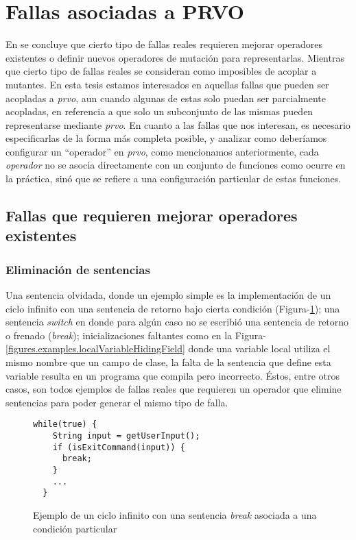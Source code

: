 \section{Fallas asociadas a PRVO}
\label{sec:prvo.prvoTargetedFaults}

En \cite{bibliography.mutation.evaluation.valid-substitute} se concluye que cierto tipo de fallas reales requieren mejorar operadores existentes o definir nuevos operadores de mutaci\'on para representarlas. Mientras que cierto tipo de fallas reales se consideran como imposibles de acoplar a mutantes. En esta tesis estamos interesados en aquellas fallas que pueden ser acopladas a \emph{prvo}, aun cuando algunas de estas solo puedan ser parcialmente acopladas, en referencia a que solo un subconjunto de las mismas pueden representarse mediante \emph{prvo}. En cuanto a las fallas que nos interesan, es necesario especificarlas de la forma m\'as completa posible, y analizar como deber\'iamos configurar un ``operador'' en \emph{prvo}, como mencionamos anteriormente, cada \emph{operador} no se asocia directamente con un conjunto de funciones como ocurre en la pr\'actica, sin\'o que se refiere a una configuraci\'on particular de estas funciones.

\subsection{Fallas que requieren mejorar operadores existentes}

\subsubsection{Eliminaci\'on de sentencias}

Una sentencia olvidada, donde un ejemplo simple es la implementaci\'on de un ciclo infinito con una sentencia de retorno bajo cierta condici\'on (Figura-\ref{figures.examples.infCicle}); una sentencia \emph{switch} en donde para alg\'un caso no se escribi\'o una sentencia de retorno o frenado (\emph{break}); inicializaciones faltantes como en la Figura-\ref{figures.examples.localVariableHidingField} donde una variable local utiliza el mismo nombre que un campo de clase, la falta de la sentencia que define esta variable resulta en un programa que compila pero incorrecto. \'Estos, entre otros casos, son todos ejemplos de fallas reales que requieren un operador que elimine sentencias para poder generar el mismo tipo de falla.

\begin{figure}
	\begin{lstlisting}[frame=single, mathescape=true,framexleftmargin=1.5em]
  while(true) {
    String input = getUserInput();
    if (isExitCommand(input)) {
      break;
    }
    ...
  }
	\end{lstlisting}
	\caption{Ejemplo de un ciclo infinito con una sentencia \emph{break} asociada a una condici\'on particular}
	\label{figures.examples.infCicle}
\end{figure}

